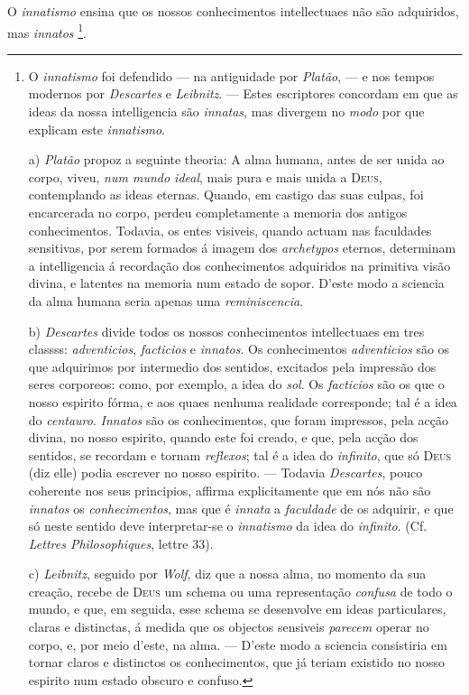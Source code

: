 
 
O \emph{innatismo} ensina que os nossos conhecimentos intellectuaes não são adquiridos, mas \emph{innatos} \footnote{O \emph{innatismo} foi defendido --- na antiguidade por \emph{Platão}, --- e nos tempos modernos por \emph{Descartes} e \emph{Leibnitz}. --- Estes escriptores concordam em que as ideas da nossa intelligencia são \emph{innatas}, mas divergem no \emph{modo} por que explicam este \emph{innatismo}.\par a) \emph{Platão} propoz a seguinte theoria: A alma humana, antes de ser unida ao corpo, viveu, \emph{num mundo ideal}, mais pura e mais unida a \textsc{Deus}, contemplando as ideas eternas. Quando, em castigo das suas culpas, foi encarcerada no corpo, perdeu completamente a memoria dos antigos conhecimentos. Todavia, os entes visiveis, quando actuam nas faculdades sensitivas, por serem formados á imagem dos \emph{archetypos} eternos, determinam a intelligencia á recordação dos conhecimentos adquiridos na primitiva visão divina, e latentes na memoria num estado de sopor. D'este modo a sciencia da alma humana seria apenas uma \emph{reminiscencia}.\par b) \emph{Descartes} divide todos os nossos conhecimentos intellectuaes em tres classss: \emph{adventicios}, \emph{facticios} e \emph{innatos}. Os conhecimentos \emph{adventicios} são os que adquirimos por intermedio dos sentidos, excitados pela impressão dos seres corporeos: como, por exemplo, a idea do \emph{sol}. Os \emph{facticios} são os que o nosso espirito fórma, e aos quaes nenhuma realidade corresponde; tal é a idea do \emph{centauro}. \emph{Innatos} são os conhecimentos, que foram impressos, pela acção divina, no nosso espirito, quando este foi creado, e que, pela acção dos sentidos, se recordam e tornam \emph{reflexos}; tal é a idea do \emph{infinito}, que só \textsc{Deus} (diz elle) podia escrever no nosso espirito. --- Todavia \emph{Descartes}, pouco coherente nos seus principios, affirma explicitamente que em nós não são \emph{innatos} os \emph{conhecimentos}, mas que é \emph{innata} a \emph{faculdade} de os adquirir, e que só neste sentido deve interpretar-se o \emph{innatismo} da idea do \emph{infinito}. (Cf. \emph{Lettres Philosophiques}, lettre 33).\par c) \emph{Leibnitz}, seguido por \emph{Wolf}, diz que a nossa alma, no momento da sua creação, recebe de \textsc{Deus} um schema ou uma representação \emph{confusa} de todo o mundo, e que, em seguida, esse schema se desenvolve em ideas particulares, claras e distinctas, á medida que os objectos sensiveis \emph{parecem} operar no corpo, e, por meio d'este, na alma. --- D'este modo a sciencia consistiria em tornar claros e distinctos os conhecimentos, que já teriam existido no nosso espirito num estado obscuro e confuso.}.

